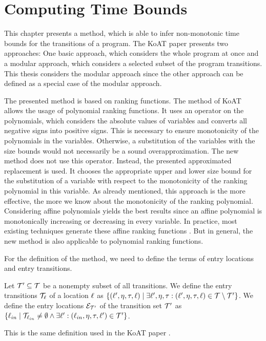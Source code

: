 \section{Computing Time Bounds}

This chapter presents a method, which is able to infer non-monotonic time bounds for the transitions of a program.
The KoAT paper \cite{koat} presents two approaches: One basic approach, which considers the whole program at once and a modular approach, which considers a selected subset of the program transitions.
This thesis considers the modular approach since the other approach can be defined as a special case of the modular approach.

The presented method is based on ranking functions.
The method of KoAT \cite{koat} allows the usage of polynomial ranking functions.
It uses an operator on the polynomials, which considers the absolute values of variables and converts all negative signs into positive signs.
This is necessary to ensure monotonicity of the polynomials in the variables.
Otherwise, a substitution of the variables with the size bounds would not necessarily be a sound overapproximation.
The new method does not use this operator.
Instead, the presented approximated replacement is used.
It chooses the appropriate upper and lower size bound for the substitution of a variable with respect to the monotonicity of the ranking polynomial in this variable.
As already mentioned, this approach is the more effective, the more we know about the monotonicity of the ranking polynomial.
Considering affine polynomials yields the best results since an affine polynomial is monotonically increasing or decreasing in every variable.
In practice, most existing techniques generate these affine ranking functions \cite{podelski2004prf, bradley2005linear, bagnara2012new, leike2014ranking, ben2013linear}.
But in general, the new method is also applicable to polynomial ranking functions.

For the definition of the method, we need to define the terms of entry locations and entry transitions.
\begin{definition}
  Let $\mathcal{T}' \subseteq \mathcal{T}$ be a nonempty subset of all transitions.
  We define the entry transitions $\mathcal{T}_{\ell}$ of a location $\ell$ as $\lbrace (\ell', \eta, \tau, \ell) \mid \exists \ell', \eta, \tau: (\ell', \eta, \tau, \ell) \in \mathcal{T} \setminus \mathcal{T}' \rbrace$.
  We define the entry locations $\mathcal{E}_{\mathcal{T}'}$ of the transition set $\mathcal{T}'$ as $\lbrace \ell_{in} \mid \mathcal{T}_{\ell_{in}} \neq \emptyset \wedge \exists \ell': (\ell_{in}, \eta, \tau, \ell') \in \mathcal{T}' \rbrace$.
\end{definition}
This is the same definition used in the KoAT paper \cite{koat}.

